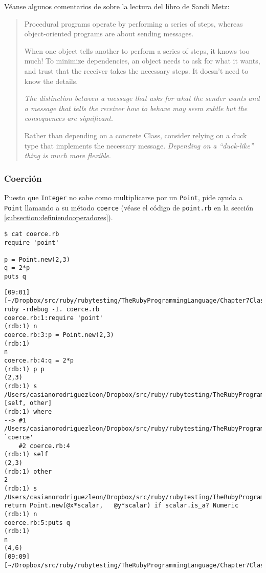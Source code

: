 Véanse algunos comentarios de 
 sobre la lectura 
del libro
de Sandi Metz:
\begin{quote}
Procedural programs operate by performing a series of steps, whereas
object-oriented programs are about sending messages.

When one object tells another to perform a series of steps, it knows
too much! To minimize dependencies, an object needs to ask for what
it wants, and trust that the receiver takes the necessary steps.
It doesn't need to know the details.

\emph{The distinction between a message that asks for what the sender
wants and a message that tells the receiver how to behave may seem
subtle but the consequences are significant}.

Rather than depending on a concrete Class, consider relying on a
duck type that implements the necessary message. \emph{Depending on a
“duck-like” thing is much more flexible}.
\end{quote}


\subsubsection{Coerción}
Puesto que \verb|Integer| no sabe como multiplicarse por un \verb|Point|,
pide ayuda a \verb|Point| llamando a su método \verb|coerce|
(véase el código de \verb|point.rb| en la sección
\ref{subsection:definiendooperadores}).

\begin{verbatim}
$ cat coerce.rb 
require 'point'

p = Point.new(2,3)
q = 2*p
puts q
\end{verbatim}

\begin{verbatim}
[09:01][~/Dropbox/src/ruby/rubytesting/TheRubyProgrammingLanguage/Chapter7ClassesAndModules/point]$ ruby -rdebug -I. coerce.rb 
coerce.rb:1:require 'point'
(rdb:1) n
coerce.rb:3:p = Point.new(2,3)
(rdb:1) 
n
coerce.rb:4:q = 2*p
(rdb:1) p p
(2,3)
(rdb:1) s
/Users/casianorodriguezleon/Dropbox/src/ruby/rubytesting/TheRubyProgrammingLanguage/Chapter7ClassesAndModules/point/point.rb:34:    [self, other]
(rdb:1) where
--> #1 /Users/casianorodriguezleon/Dropbox/src/ruby/rubytesting/TheRubyProgrammingLanguage/Chapter7ClassesAndModules/point/point.rb:34:in `coerce'
    #2 coerce.rb:4
(rdb:1) self
(2,3)
(rdb:1) other
2
(rdb:1) s
/Users/casianorodriguezleon/Dropbox/src/ruby/rubytesting/TheRubyProgrammingLanguage/Chapter7ClassesAndModules/point/point.rb:29:    return Point.new(@x*scalar,   @y*scalar) if scalar.is_a? Numeric
(rdb:1) n
coerce.rb:5:puts q
(rdb:1) 
n
(4,6)
[09:09][~/Dropbox/src/ruby/rubytesting/TheRubyProgrammingLanguage/Chapter7ClassesAndModules/point]$ 
\end{verbatim}

